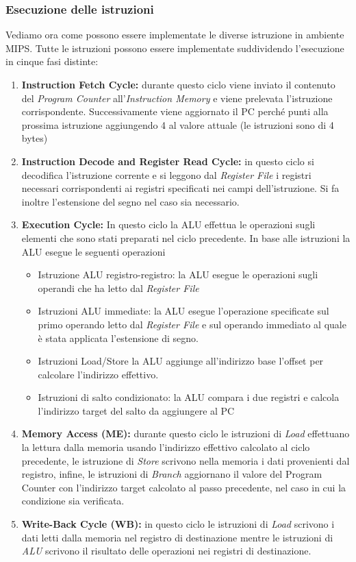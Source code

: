 \subsubsection{Esecuzione delle istruzioni}
Vediamo ora come possono essere implementate le diverse istruzione in ambiente MIPS. Tutte le istruzioni possono essere implementate suddividendo l'esecuzione in cinque fasi distinte:
\begin{enumerate}
\item \textbf{Instruction Fetch Cycle:} durante questo ciclo viene inviato il contenuto del \emph{Program Counter} all'\emph{Instruction Memory} e viene prelevata l'istruzione corrispondente. Successivamente viene aggiornato il PC perché punti alla prossima istruzione aggiungendo 4 al valore attuale (le istruzioni sono di 4 bytes)
\item \textbf{Instruction Decode and Register Read Cycle:} in questo ciclo si decodifica l'istruzione corrente e si leggono dal \emph{Register File} i registri necessari corrispondenti ai registri specificati nei campi dell'istruzione. Si fa inoltre l'estensione del segno nel caso sia necessario.
\item \textbf{Execution Cycle:} In questo ciclo la ALU effettua le operazioni sugli elementi che sono stati preparati nel ciclo precedente. In base alle istruzioni la ALU esegue le seguenti operazioni
\begin{itemize}
\item Istruzione ALU registro-registro: la ALU esegue le operazioni sugli operandi che ha letto dal \emph{Register File}
\item Istruzioni ALU immediate: la ALU esegue l'operazione specificate sul primo operando letto dal \emph{Register File} e sul operando immediato al quale è stata applicata l'estensione di segno.
\item Istruzioni Load/Store la ALU aggiunge all'indirizzo base l'offset per calcolare l'indirizzo effettivo.
\item Istruzioni di salto condizionato: la ALU compara i due registri e calcola l'indirizzo target del salto da aggiungere al PC
\end{itemize}
\item \textbf{Memory Access (ME):} durante questo ciclo le istruzioni di \emph{Load} effettuano la lettura dalla memoria usando l'indirizzo effettivo calcolato al ciclo precedente, le istruzione di \emph{Store} scrivono nella memoria i dati provenienti dal registro, infine, le istruzioni di \emph{Branch}  aggiornano il valore del Program Counter con l'indirizzo target calcolato al passo precedente, nel caso in cui la condizione sia verificata.
\item \textbf{Write-Back Cycle (WB):} in questo ciclo le istruzioni di \emph{Load} scrivono i dati letti dalla memoria nel registro di destinazione mentre le istruzioni di \emph{ALU} scrivono il risultato delle operazioni nei registri di destinazione.
\end{enumerate}
